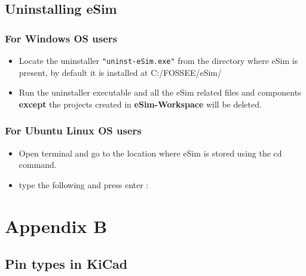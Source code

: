 \subsection{Uninstalling eSim}

\subsubsection{For Windows OS users}
\begin{itemize}
\item Locate the uninstaller {\tt "uninst-eSim.exe"} from the directory where eSim is present, by default it is installed at C:/FOSSEE/eSim/ 
\item Run the uninstaller executable and all the eSim related files and components \textbf{except} the projects created in \textbf{eSim-Workspace} will be deleted.
\end{itemize}
\subsubsection{For Ubuntu Linux OS users}
\begin{itemize}
\item Open terminal and go to the location where eSim is stored using the cd command.
\item type the following and press enter : \\
\end{itemize}
\section{Appendix B}

\subsection{Pin types in KiCad}


